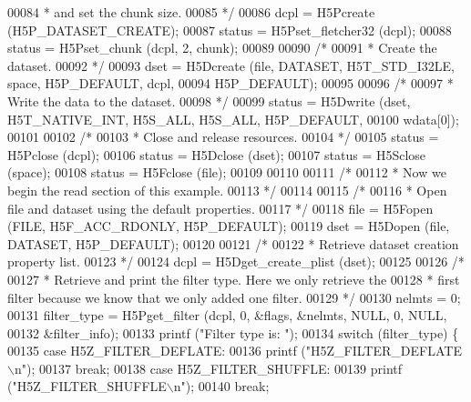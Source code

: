 \begin{DoxyCode}
00084 \textcolor{comment}{     * and set the chunk size.}
00085 \textcolor{comment}{     */}
00086     dcpl = H5Pcreate (H5P\_DATASET\_CREATE);
00087     status = H5Pset\_fletcher32 (dcpl);
00088     status = H5Pset\_chunk (dcpl, 2, chunk);
00089 
00090     \textcolor{comment}{/*}
00091 \textcolor{comment}{     * Create the dataset.}
00092 \textcolor{comment}{     */}
00093     dset = H5Dcreate (file, DATASET, H5T\_STD\_I32LE, space, H5P\_DEFAULT, dcpl,
00094                 H5P\_DEFAULT);
00095 
00096     \textcolor{comment}{/*}
00097 \textcolor{comment}{     * Write the data to the dataset.}
00098 \textcolor{comment}{     */}
00099     status = H5Dwrite (dset, H5T\_NATIVE\_INT, H5S\_ALL, H5S\_ALL, H5P\_DEFAULT,
00100                 wdata[0]);
00101 
00102     \textcolor{comment}{/*}
00103 \textcolor{comment}{     * Close and release resources.}
00104 \textcolor{comment}{     */}
00105     status = H5Pclose (dcpl);
00106     status = H5Dclose (dset);
00107     status = H5Sclose (space);
00108     status = H5Fclose (file);
00109 
00110 
00111     \textcolor{comment}{/*}
00112 \textcolor{comment}{     * Now we begin the read section of this example.}
00113 \textcolor{comment}{     */}
00114 
00115     \textcolor{comment}{/*}
00116 \textcolor{comment}{     * Open file and dataset using the default properties.}
00117 \textcolor{comment}{     */}
00118     file = H5Fopen (FILE, H5F\_ACC\_RDONLY, H5P\_DEFAULT);
00119     dset = H5Dopen (file, DATASET, H5P\_DEFAULT);
00120 
00121     \textcolor{comment}{/*}
00122 \textcolor{comment}{     * Retrieve dataset creation property list.}
00123 \textcolor{comment}{     */}
00124     dcpl = H5Dget\_create\_plist (dset);
00125 
00126     \textcolor{comment}{/*}
00127 \textcolor{comment}{     * Retrieve and print the filter type.  Here we only retrieve the}
00128 \textcolor{comment}{     * first filter because we know that we only added one filter.}
00129 \textcolor{comment}{     */}
00130     nelmts = 0;
00131     filter\_type = H5Pget\_filter (dcpl, 0, &flags, &nelmts, NULL, 0, NULL,
00132                 &filter\_info);
00133     printf (\textcolor{stringliteral}{"Filter type is: "});
00134     \textcolor{keywordflow}{switch} (filter\_type) \{
00135         \textcolor{keywordflow}{case} H5Z\_FILTER\_DEFLATE:
00136             printf (\textcolor{stringliteral}{"H5Z\_FILTER\_DEFLATE\(\backslash\)n"});
00137             \textcolor{keywordflow}{break};
00138         \textcolor{keywordflow}{case} H5Z\_FILTER\_SHUFFLE:
00139             printf (\textcolor{stringliteral}{"H5Z\_FILTER\_SHUFFLE\(\backslash\)n"});
00140             \textcolor{keywordflow}{break};

\end{DoxyCode}
